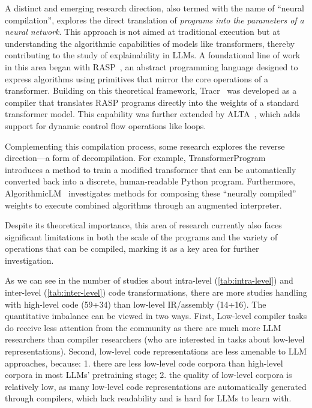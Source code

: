 \documentclass[pdflatex,sn-mathphys-ay,twocolumn, a4paper]{sn-jnl}%
\theoremstyle{thmstyleone}%
\theoremstyle{thmstyletwo}%
\theoremstyle{thmstylethree}%
\begin{document}
A distinct and emerging research direction, also termed with the name of ``neural compilation'', explores the direct translation of \textit{programs into the parameters of a neural network}. This approach is not aimed at traditional execution but at understanding the algorithmic capabilities of models like transformers, thereby contributing to the study of explainability in LLMs. A foundational line of work in this area began with RASP~\citep{165_weiss2021thinking}, an abstract programming language designed to express algorithms using primitives that mirror the core operations of a transformer. Building on this theoretical framework, Tracr~\citep{132_lindner2023tracr} was developed as a compiler that translates RASP programs directly into the weights of a standard transformer model. This capability was further extended by ALTA~\citep{83_shaw2025alta}, which adds support for dynamic control flow operations like loops.

Complementing this compilation process, some research explores the reverse direction—a form of decompilation. For example, TransformerProgram~\citep{143_friedman2023learning} introduces a method to train a modified transformer that can be automatically converted back into a discrete, human-readable Python program. Furthermore, AlgorithmicLM~\citep{20_saldyt2025algorithmiclanguagemodelsneurally} investigates methods for composing these ``neurally compiled'' weights to execute combined algorithms through an augmented interpreter.

Despite its theoretical importance, this area of research currently also faces significant limitations in both the scale of the programs and the variety of operations that can be compiled, marking it as a key area for further investigation.

As we can see in the number of studies about intra-level (\autoref{tab:intra-level}) and inter-level (\autoref{tab:inter-level}) code transformations, there are more studies handling with high-level code (59+34) than low-level IR/assembly (14+16). 
The quantitative imbalance can be viewed in two ways. First, Low-level compiler tasks do receive less attention from the community as there are much more LLM researchers than compiler researchers (who are interested in tasks about low-level representations). Second, low-level code representations are less amenable to LLM approaches, because: 1. there are less low-level code corpora than high-level corpora in most LLMs' pretraining stage; 2. the quality of low-level corpora is relatively low, as many low-level code representations are automatically generated through compilers, which lack readability and is hard for LLMs to learn with.
\end{document}
